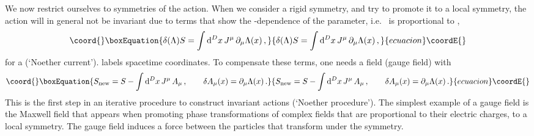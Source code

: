 \documentclass[a4paper,11pt,twoside]{article}
\def\rmd{{\rm d}}
\begin{document}
We now restrict ourselves to symmetries of the action. When we consider a
rigid symmetry, and try to promote it to a local symmetry, the action \coordHE{}
will in general not be invariant due to terms that show the
\coordHE{}-dependence of the parameter, i.e.\ \coordHE{} is proportional to
\coordHE{},
\begin{equation}\coord{}\boxEquation{
  \delta (\Lambda ) S =\int \rmd^Dx\, J^\mu\,\partial _\mu \Lambda (x)\,,
 \label{delSJdLambda}
}{
  \delta (\Lambda ) S =\int \rmd^Dx\, J^\mu\,\partial _\mu \Lambda (x)\,,
 }{ecuacion}\coordE{}\end{equation}
for a \coordHE{} (`Noether current'). \coordHE{} labels
spacetime coordinates. To compensate these terms, one needs a field
\coordHE{} (gauge field) with
\begin{equation}\coord{}\boxEquation{
  S_{\rm new}= S - \int\rmd^Dx\, J^\mu\, A_\mu \,,\qquad
  \delta A_\mu(x) =\partial _\mu \Lambda (x)\,.
 \label{SwithA}
}{
  S_{\rm new}= S - \int\rmd^Dx\, J^\mu\, A_\mu \,,\qquad
  \delta A_\mu(x) =\partial _\mu \Lambda (x)\,.
 }{ecuacion}\coordE{}\end{equation}
This is the first step in an iterative procedure to construct invariant
actions (`Noether procedure'). The simplest example of a gauge field is
the Maxwell field that appears when promoting phase transformations of
complex fields that are proportional to their electric charges, to a
local symmetry. The gauge field induces a force between the particles
that transform under the symmetry.
\end{document}
